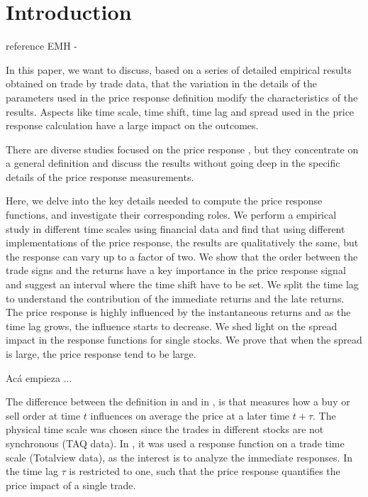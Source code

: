 \section{Introduction}\label{sec:introduction}

reference EMH - \cite{EMH_lillo}

In this paper, we want to discuss, based on a series of detailed empirical
results obtained on trade by trade data, that the variation in the details of
the parameters used in the price response definition modify the characteristics
of the results. Aspects like time scale, time shift, time lag and spread used
in the price response calculation have a large impact on the outcomes.

There are diverse studies focused on the price response \cite{EMH_lillo,Bouchaud_2004,Wang_2016_cross,Wang_2016_avg,Wang_2018_a,Wang_2018_b,large_prices_changes,theory_market_impact,dissecting_cross,spread_changes_affect,quant_stock_price_response,master_curve,ori_pow_law,pow_law_dist,prop_order_book},
but they concentrate on a general definition and discuss the results without
going deep in the specific details of the price response measurements.

Here, we delve into the key details needed to compute the price response
functions, and investigate their corresponding roles. We perform a empirical
study in different time scales using financial data and find that using
different implementations of the price response, the results are qualitatively
the same, but the response can vary up to a factor of two. We show that the
order between the trade signs and the returns have a key importance in the
price response signal and suggest an interval where the time shift have to be
set. We split the time lag to understand the contribution of the immediate
returns and the late returns. The price response is highly influenced by the
instantaneous returns and as the time lag grows, the influence starts to
decrease. We shed light on the spread impact in the response functions for
single stocks. We prove that when the spread is large, the price response tend
to be large.



Acá empieza ...

The difference between the definition in \cite{Wang_2016_cross} and in
\cite{Wang_2018_b}, is that \cite{Wang_2016_cross} measures how a buy or sell
order at time $t$ influences on average the price at a later time $t + \tau$.
The physical time scale was chosen since the trades in different stocks are not
synchronous (TAQ data). In \cite{Wang_2018_b}, it was used a response function
on a trade time scale (Totalview data), as the interest is to analyze the
immediate responses. In \cite{Wang_2018_b} the time lag $\tau$ is restricted to
one, such that the price response quantifies the price impact of a single
trade.

